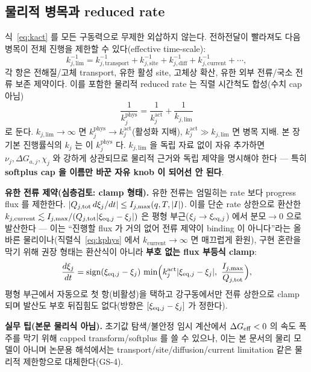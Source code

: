 \subsection{물리적 병목과 reduced rate}
식~\eqref{eq:kact} 를 모든 구동력으로 무제한 외삽하지 않는다. 전하전달이 빨라져도 다음 병목이 전체
진행을 제한할 수 있다(effective time-scale):
\begin{equation}
k_{j,\mathrm{lim}}^{-1}=k_{j,\mathrm{transport}}^{-1}+k_{j,\mathrm{site}}^{-1}+k_{j,\mathrm{diff}}^{-1}
+k_{j,\mathrm{current}}^{-1}+\cdots,
\label{eq:klim_comp}
\end{equation}
각 항은 전해질/고체 transport, 유한 활성 site, 고체상 확산, 유한 외부 전류/국소 전류 보존 제약이다.
이를 포함한 물리적 reduced rate 는 직렬 시간척도 합성(수치 cap 아님)
\begin{equation}
\boxed{\;\frac{1}{k_j^\mathrm{phys}}=\frac{1}{k_j^\mathrm{act}}+\frac{1}{k_{j,\mathrm{lim}}}\;}
\label{eq:kphys}
\end{equation}
로 둔다. $k_{j,\mathrm{lim}}\to\infty$ 면 $k_j^\mathrm{phys}\to k_j^\mathrm{act}$(활성화 지배),
$k_j^\mathrm{act}\gg k_{j,\mathrm{lim}}$ 면 병목 지배. 본 장 기본 진행률식의 $k_j$ 는 이
$k_j^\mathrm{phys}$ 다. $k_{j,\mathrm{lim}}$ 을 독립 자료 없이 자유 추가하면 $\nu_j,\Delta G_{a,j},\chi_j$
와 강하게 상관되므로 물리적 근거와 독립 제약을 명시해야 한다 — 특히 \textbf{softplus cap 을 이름만 바꾼
자유 knob 이 되어선 안 된다}.

\textbf{유한 전류 제약(심층검토: clamp 형태).} 유한 전류는 엄밀히는 rate 보다 progress flux 를 제한한다.
$|Q_{j,\mathrm{tot}}\,d\xi_j/dt|\le I_{j,\max}(q,T,|I|)$. 이를 단순 rate 상한으로 환산한
$k_{j,\mathrm{current}}\lesssim I_{j,\max}/(Q_{j,\mathrm{tot}}|\xi_{\mathrm{eq},j}-\xi_j|)$ 은 평형 부근($\xi_j\to\xi_{\mathrm{eq},j}$)
에서 분모$\to0$ 으로 발산한다 — 이는 ``진행할 flux 가 거의 없어 전류 제약이 binding 이 아니다''라는
올바른 물리이나(직렬식~\eqref{eq:kphys} 에서 $k_{\mathrm{current}}\to\infty$ 면 매끄럽게 환원), 구현
혼란을 막기 위해 권장 형태는 환산식이 아니라 \textbf{부호 없는 flux 부등식 clamp}:
\begin{equation}
\frac{d\xi_j}{dt}=\operatorname{sign}(\xi_{\eq,j}-\xi_j)\,
\min\!\Big(k_j^\mathrm{act}|\xi_{\eq,j}-\xi_j|,\ \frac{I_{j,\max}}{Q_{j,\tot}}\Big),
\label{eq:clamp}
\end{equation}
평형 부근에서 자동으로 첫 항(비활성)을 택하고 강구동에서만 전류 상한으로 clamp 되며 발산도 부호
뒤집힘도 없다(방향은 $[\xi_{\mathrm{eq},j}-\xi_j]$ 가 정한다).
\begin{mdframed}
\textbf{실무 팁(본문 물리식 아님).} 초기값 탐색/불안정 임시 계산에서 $\Delta G_{\mathrm{eff}}<0$ 의 속도 폭주를
막기 위해 capped transform/softplus 를 쓸 수 있으나, 이는 본 문서의 물리 모델이 아니며 논문용 해석에서는
transport/site/diffusion/current limitation 같은 물리적 제한항으로 대체한다(GS-4).
\end{mdframed}

